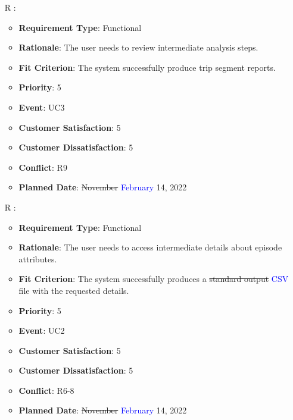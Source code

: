 \documentclass[12pt, titlepage]{article}
\newcounter{reqnum} %
\begin{document}
\begin{itemize}
\item[R\refstepcounter{reqnum}\thereqnum
\label{R_Inputs_1}:] 
\begin{itemize}
    \item \textbf{Requirement Type}: Functional
    \item \textbf{Rationale}: The user needs to review intermediate analysis steps. 
    \item \textbf{Fit Criterion}: The system successfully produce trip segment reports. 
    \item \textbf{Priority}: 5
    \item \textbf{Event}: UC3
    \item \textbf{Customer Satisfaction}: 5
    \item \textbf{Customer Dissatisfaction}: 5
    \item \textbf{Conflict}: R9
    \item \textbf{Planned Date}: \sout{November} \textcolor{blue}{February} 14, 2022
\end{itemize}

\item[R\refstepcounter{reqnum}\thereqnum
\label{R_Inputs_1}:] 
\begin{itemize}
    \item \textbf{Requirement Type}: Functional
    \item \textbf{Rationale}: The user needs to access intermediate details about episode attributes.
    \item \textbf{Fit Criterion}: The system successfully produces a \sout{standard output} \textcolor{blue}{CSV} file with the requested details.
    \item \textbf{Priority}: 5
    \item \textbf{Event}: UC2
    \item \textbf{Customer Satisfaction}: 5
    \item \textbf{Customer Dissatisfaction}: 5
    \item \textbf{Conflict}: R6-8
    \item \textbf{Planned Date}: \sout{November} \textcolor{blue}{February} 14, 2022
\end{itemize}


\end{itemize}
\end{document}
